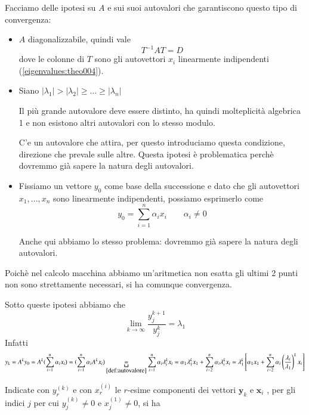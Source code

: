Facciamo delle ipotesi su $A$ e sui suoi autovalori
che garantiscono questo tipo di convergenza:
\begin{itemize}
\item $A$ diagonalizzabile, quindi vale
  $$ T^{-1}AT = D $$ 
  dove le colonne di $T$ sono gli autovettori $x_i$ linearmente
  indipendenti (\ref{eigenvalues:theo004}).
\item 
  Siano $|\lambda_1| > |\lambda_2| \geq \ldots \geq |\lambda_n| $

  Il pi\`u grande autovalore deve essere distinto, ha quindi
  molteplicit\`a algebrica 1 e non esistono altri autovalori con lo
  stesso modulo.
  \begin{notes}
    C'e un autovalore che attira, per questo introduciamo questa
    condizione, direzione che prevale sulle altre.  Questa ipotesi \`e
    problematica perch\`e dovremmo gi\`a sapere la natura degli
    autovalori.
  \end{notes}
\item
  Fissiamo un vettore $y_0$ come base della successione e dato che gli
  autovettori $x_1, \ldots, x_n$ sono linearmente indipendenti, possiamo
  esprimerlo come
  $$ y_0 = \displaystyle \sum_{i=1}^{n} \alpha_i x_i \qquad 
  \alpha_i \neq 0 $$
  \begin{notes}
    Anche qui abbiamo lo stesso problema: dovremmo gi\`a sapere la
    natura degli autovalori.
  \end{notes}
\end{itemize}

\begin{notes}
  Poich\`e nel calcolo macchina abbiamo un'aritmetica non esatta gli
  ultimi 2 punti non sono strettamente necessari, si ha comunque
  convergenza.
\end{notes}

Sotto queste ipotesi abbiamo che
$$
\lim_{k \to \infty}  \dfrac{y_j^{k+1}}{y_j^{k}} =  \lambda_1
$$
Infatti
\begin{equation}
  \label{eigenvalues:03}
  y_k = A^{k}y_0 = 
  A^{k} (\displaystyle \sum_{i=1}^{n} \alpha_i x_i) =
  (\sum_{i=1}^{n} \alpha_i A^{k} x_i) \underbracket{=}_{\ref{def:autovalore}}
  \sum_{i=1}^{n} \alpha_i \lambda_i^{k} x_i =
  \alpha_1 \lambda_1^{k} x_1 + \sum_{i=2}^{n} \alpha_i \lambda_i^{k}x_i =
  \lambda_1^{k} \left[ \alpha_1 x_1 +
    \sum_{i=2}^{n} \alpha_i\left(\dfrac{\lambda_i}{\lambda_1}\right)^{k}x_i \right]
\end{equation}

Indicate con $y_r^{(k)}$ e con $x_r^{(i)}$ le $r$-esime componenti dei vettori
$\mathbf{y}_k$ e $\mathbf{x}_i$ , per gli indici $j$ per cui $y_j^{(k)} \neq 0$ e
$x_j^{(1)} \neq 0$, si ha

